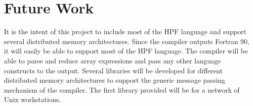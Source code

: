 \section{Future Work}
It is the intent of this project to include most of the HPF language and
support several distributed memory architectures.  Since the compiler
outputs Fortran 90, it will easily be able to support most of the HPF language.
The compiler will be able to parse and reduce array expressions and pass
any other language constructs to the output.  Several libraries will be
developed for different distributed memory architectures to support the
generic message passing mechanism of the compiler.  The first library
provided will be for a network of Unix workstations.

